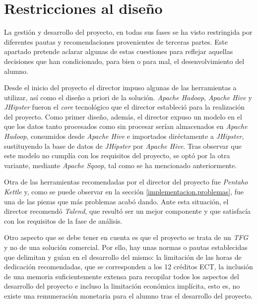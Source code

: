 \section{Restricciones al diseño} \label{disenyo.restricciones}
La gestión y desarrollo del proyecto, en todas sus fases se ha visto restringida por diferentes pautas y recomendaciones provenientes de terceras partes. Este apartado pretende aclarar algunas de estas cuestiones para reflejar aquellas decisiones que han condicionado, para bien o para mal, el desenvolvimiento del alumno. 
\par Desde el inicio del proyecto el director impuso algunas de las herramientas a utilizar, así como el diseño a priori de la solución. \textit{Apache Hadoop}, \textit{Apache Hive} y \textit{JHipster} fueron el \textit{core} tecnológico que el director estableció para la realización del proyecto. Como primer diseño, además, el director expuso un modelo en el que los datos tanto procesados como sin procesar serían almacenados en \textit{Apache Hadoop}, consumidos desde \textit{Apache Hive} e importados diréctamente a \textit{JHipster}, sustituyendo la base de datos de \textit{JHipster} por \textit{Apache Hive}. Tras observar que este modelo no cumplía con los requisitos del proyecto, se optó por la otra variante, mediante \textit{Apache Sqoop}, tal como se ha mencionado anteriormente. 
\par Otra de las herramientas recomendadas por el director del proyecto fue \textit{Pentaho Kettle} y, como se puede observar en la sección \ref{implementacion.problemas}, fue una de las piezas que más problemas acabó dando. Ante esta situación, el director recomendó \textit{Talend}, que resultó ser un mejor componente y que satisfacía con los requisitos de la fase de análisis.
\par Otro aspecto que se debe tener en cuenta es que el proyecto se trata de un \textit{TFG} y no de una solución comercial. Por ello, hay unas normas o pautas  establecidas que delimitan y guían en el desarrollo del mismo: la limitación de las horas de dedicación recomendadas, que se corresponden a los 12 créditos ECT, la inclusión de una memoria suficientemente extensa para recopilar todos los aspectos del desarrollo del proyecto e incluso la limitación económica implícita, esto es, no existe una remuneración monetaria para el alumno tras el desarrollo del proyecto. 





